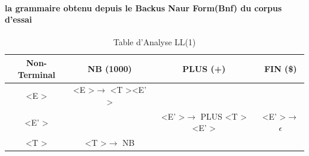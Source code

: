 \documentclass[11pt]{}
\begin{document}
    \paragraph{la grammaire obtenu depuis le Backus Naur Form(Bnf) du corpus d'essai}

    \begin{table}[h!]
\centering
\begin{tabular}{|c|c|c|c|}
\hline
\textbf{Non-Terminal} & \textbf{NB (1000)} & \textbf{PLUS (+)} & \textbf{FIN (\$)} \\ \hline
\textless E \textgreater & \textless E \textgreater $\rightarrow$ \textless T \textgreater \textless E' \textgreater & & \\ \hline
\textless E' \textgreater & & \textless E' \textgreater $\rightarrow$ PLUS \textless T \textgreater \textless E' \textgreater & \textless E' \textgreater $\rightarrow$ $\epsilon$ \\ \hline
\textless T \textgreater & \textless T \textgreater $\rightarrow$ NB & & \\ \hline
\end{tabular}
\caption{Table d'Analyse LL(1)}
\end{table}
\end{document}
